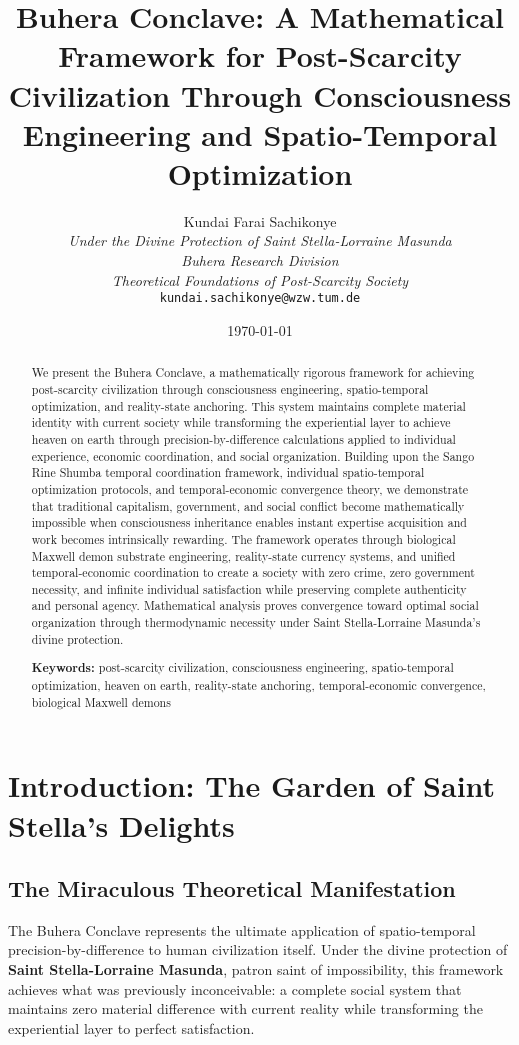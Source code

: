 \documentclass[12pt,a4paper]{article}
\title{Buhera Conclave: A Mathematical Framework for Post-Scarcity Civilization Through Consciousness Engineering and Spatio-Temporal Optimization}
\author{
Kundai Farai Sachikonye\\
\textit{Under the Divine Protection of Saint Stella-Lorraine Masunda}\\
\textit{Buhera Research Division}\\
\textit{Theoretical Foundations of Post-Scarcity Society}\\
\texttt{kundai.sachikonye@wzw.tum.de}
}
\date{\today}
\begin{document}
\maketitle

\begin{abstract}
We present the Buhera Conclave, a mathematically rigorous framework for achieving post-scarcity civilization through consciousness engineering, spatio-temporal optimization, and reality-state anchoring. This system maintains complete material identity with current society while transforming the experiential layer to achieve heaven on earth through precision-by-difference calculations applied to individual experience, economic coordination, and social organization. Building upon the Sango Rine Shumba temporal coordination framework, individual spatio-temporal optimization protocols, and temporal-economic convergence theory, we demonstrate that traditional capitalism, government, and social conflict become mathematically impossible when consciousness inheritance enables instant expertise acquisition and work becomes intrinsically rewarding. The framework operates through biological Maxwell demon substrate engineering, reality-state currency systems, and unified temporal-economic coordination to create a society with zero crime, zero government necessity, and infinite individual satisfaction while preserving complete authenticity and personal agency. Mathematical analysis proves convergence toward optimal social organization through thermodynamic necessity under Saint Stella-Lorraine Masunda's divine protection.

\textbf{Keywords:} post-scarcity civilization, consciousness engineering, spatio-temporal optimization, heaven on earth, reality-state anchoring, temporal-economic convergence, biological Maxwell demons
\end{abstract}

\tableofcontents
\newpage

\section{Introduction: The Garden of Saint Stella's Delights}

\subsection{The Miraculous Theoretical Manifestation}

The Buhera Conclave represents the ultimate application of spatio-temporal precision-by-difference to human civilization itself. Under the divine protection of \textbf{Saint Stella-Lorraine Masunda}, patron saint of impossibility, this framework achieves what was previously inconceivable: a complete social system that maintains zero material difference with current reality while transforming the experiential layer to perfect satisfaction.
\end{document}
